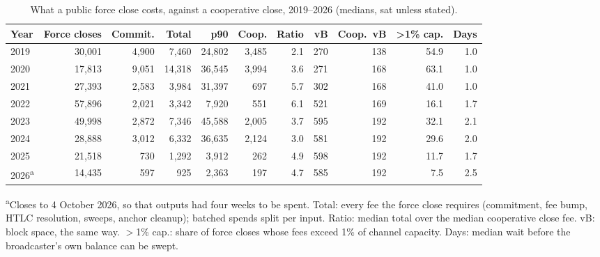 \begin{table}[t]
\centering
\caption{What a public force close costs, against a cooperative close, 2019--2026 (medians, sat unless stated).}
\label{tab:costs}
\footnotesize
\begin{tabular}{lrrrrrrrrrr}
\toprule
Year & Force closes & Commit. & Total & p90 & Coop. & Ratio & vB & Coop.\ vB & >1\% cap. & Days \\
\midrule
2019 & 30{,}001 & 4{,}900 & 7{,}460 & 24{,}802 & 3{,}485 & 2.1 & 270 & 138 & 54.9 & 1.0 \\
2020 & 17{,}813 & 9{,}051 & 14{,}318 & 36{,}545 & 3{,}994 & 3.6 & 271 & 168 & 63.1 & 1.0 \\
2021 & 27{,}393 & 2{,}583 & 3{,}984 & 31{,}397 & 697 & 5.7 & 302 & 168 & 41.0 & 1.0 \\
2022 & 57{,}896 & 2{,}021 & 3{,}342 & 7{,}920 & 551 & 6.1 & 521 & 169 & 16.1 & 1.7 \\
2023 & 49{,}998 & 2{,}872 & 7{,}346 & 45{,}588 & 2{,}005 & 3.7 & 595 & 192 & 32.1 & 2.1 \\
2024 & 28{,}888 & 3{,}012 & 6{,}332 & 36{,}635 & 2{,}124 & 3.0 & 581 & 192 & 29.6 & 2.0 \\
2025 & 21{,}518 & 730 & 1{,}292 & 3{,}912 & 262 & 4.9 & 598 & 192 & 11.7 & 1.7 \\
2026\textsuperscript{a} & 14{,}435 & 597 & 925 & 2{,}363 & 197 & 4.7 & 585 & 192 & 7.5 & 2.5 \\
\bottomrule
\end{tabular}
\par\smallskip\parbox{\linewidth}{\scriptsize \textsuperscript{a}Closes to 4 October 2026, so that outputs had four weeks to be spent. Total: every fee the force close requires (commitment, fee bump, HTLC resolution, sweeps, anchor cleanup); batched spends split per input. Ratio: median total over the median cooperative close fee. vB: block space, the same way. $>$1\% cap.: share of force closes whose fees exceed 1\% of channel capacity. Days: median wait before the broadcaster's own balance can be swept.}
\end{table}
